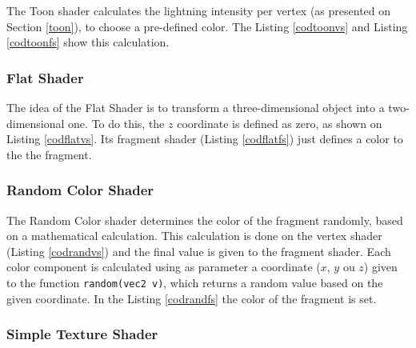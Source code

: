 \documentclass[10pt, conference, compsocconf]{IEEEtran}
\begin{document}
{	The Toon shader calculates the lightning intensity  per vertex (as presented on Section \ref{toon}), to choose a pre-defined color. The Listing \ref{codtoonvs}  and Listing \ref{codtoonfs} show this calculation.

	
  
 	

\subsubsection{Flat Shader}

	The idea of the Flat Shader is to transform a three-dimensional object into a two-dimensional one. To do this, the $z$ coordinate is defined as zero, as shown on Listing \ref{codflatvs}. 
Its fragment shader (Listing \ref{codflatfs}) just defines a color to the the fragment.

	

	

\subsubsection{Random Color Shader}

	The Random Color shader determines the color of the fragment randomly, based on a mathematical calculation. This calculation is done on the vertex shader (Listing \ref{codrandvs}) and the final value is given to the fragment shader. 
Each color component is calculated using as parameter a coordinate ($x$, $y$ ou $z$) given to the function \texttt{random(vec2 v)}, which returns a random value based on the given coordinate. In the Listing \ref{codrandfs} the color of the fragment is set.

	
 
	


\subsubsection{Simple Texture Shader}

}
\end{document}
